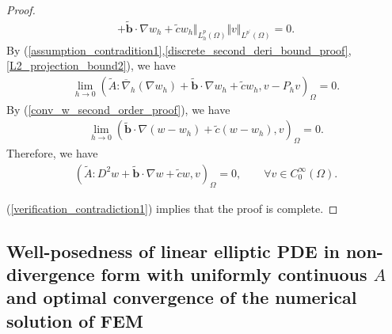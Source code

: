 \documentclass[12pt]{amsart}
\theoremstyle{definition}
\theoremstyle{remark}
\begin{document}
\begin{proof}
\begin{align*}
+ \tilde{\boldsymbol{b}}\cdot \nabla w_{h} + \tilde{c} w_{h}\Vert_{L_{h}^{p}(\Omega)} 
\Vert v\Vert_{L^{p^{\prime}}(\Omega)} = 0.
\end{align*}
By (\ref{assumption_contradition1},\ref{discrete_second_deri_bound_proof},\ref{L2_projection_bound2}), we have 
\begin{align*}
\lim_{h\rightarrow 0} (\tilde{A}:\overline{\nabla}_{h}(\nabla w_{h})
+\tilde{\boldsymbol{b}}\cdot\nabla w_{h}+\tilde{c}w_{h},v-P_{h}v)_{\Omega} = 0.
\end{align*}
By (\ref{conv_w_second_order_proof}), we have 
\begin{align*}
\lim_{h\rightarrow 0} (\tilde{\boldsymbol{b}}\cdot \nabla (w-w_{h}) + \tilde{c}(w-w_{h}), v)_{\Omega} = 0.
\end{align*}
Therefore, we have 
\begin{align}
\label{verification_contradiction1}
(\tilde{A}:D^{2}w + \tilde{\boldsymbol{b}}\cdot \nabla w 
+ \tilde{c}w, v)_{\Omega} = 0, \qquad \forall v \in C_{0}^{\infty}(\Omega).
\end{align}

(\ref{verification_contradiction1}) implies that the proof is complete.
\end{proof}

\subsection{Well-posedness of linear elliptic PDE in non-divergence form with uniformly continuous $A$ and optimal 
convergence of the numerical solution of FEM}
\end{document}

